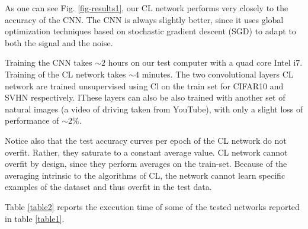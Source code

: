 \documentclass{article} %
\begin{document}
As one can see Fig. \ref{fig-results1}, our CL network performs very closely to the accuracy of the CNN. The CNN is always slightly better, since it uses global optimization techniques based on stochastic gradient descent (SGD) to adapt to both the signal and the noise. 

Training the CNN takes $\sim 2$ hours on our test computer with a quad core Intel i7. Training of the CL network takes $\sim 4$ minutes.
The two convolutional layers CL network are trained unsupervised using Cl on the train set for CIFAR10 and SVHN respectively. IThese layers can also be also trained with another set of natural images (a video of driving taken from YouTube), with only a slight loss of performance of $\sim 2\%$. 

Notice also that the test accuracy curves per epoch of the CL network do not overfit. Rather, they saturate to a constant average value. CL network cannot overfit by design, since they perform averages on the train-set. Because of the averaging intrinsic to the algorithms of CL, the network cannot learn specific examples of the dataset and thus overfit in the test data.

%

Table \ref{table2} reports the execution time of some of the tested networks reported in table \ref{table1}.
\end{document}
